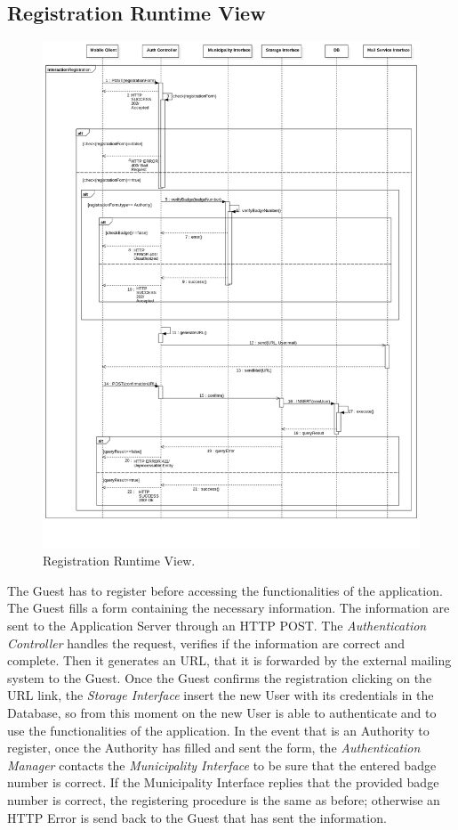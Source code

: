 \documentclass{report}
\begin{document}
\subsection{Registration Runtime View}
\begin{figure}[!h]
	\begin{center}
	\includegraphics[width=\textwidth]{img/Registration1.png}
    \end{center}
    \label{fig:RegistrationSD}
	\caption{Registration Runtime View.}
\end{figure}
The Guest has to register before accessing the functionalities of the application. The Guest fills a form containing the necessary information. The information are sent to the Application Server through an HTTP POST. The \textit{Authentication Controller} handles the request, verifies if the information are correct and complete. Then it generates an URL, that it is forwarded by the external mailing system to the Guest. Once the Guest confirms the registration clicking on the URL link, the \textit{Storage Interface} insert the new User with its credentials in the Database, so from this moment on the new User is able to authenticate and to use the functionalities of the application.
In the event that is an Authority to register, once the Authority has filled and sent the form, the \textit{Authentication Manager} contacts the \textit{Municipality Interface} to be sure that the entered badge number is correct. If the Municipality Interface replies that the provided badge number is correct, the registering procedure is the same as before; otherwise an HTTP Error is send back to the Guest that has sent the information.    
\end{document}
